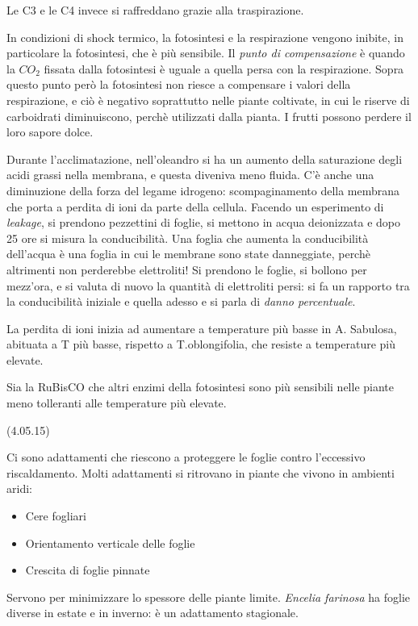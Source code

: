 \documentclass[a4paper,12pt]{book}
\begin{document}
Le C3 e le C4 invece si raffreddano grazie alla traspirazione.

In condizioni di shock termico, la fotosintesi e la respirazione vengono inibite, in particolare la fotosintesi, che è più sensibile.
Il \emph{punto di compensazione} è quando la $CO_{2}$ fissata dalla fotosintesi è uguale a quella persa con la respirazione. Sopra questo punto però la fotosintesi non riesce a compensare i valori della respirazione, e ciò è negativo soprattutto nelle piante coltivate, in cui le riserve di carboidrati diminuiscono, perchè utilizzati dalla pianta. I frutti possono perdere il loro sapore dolce.

Durante l'acclimatazione, nell'oleandro si ha un aumento della saturazione degli acidi grassi nella membrana, e questa diveniva meno fluida. C'è anche una diminuzione della forza del legame idrogeno: scompaginamento della membrana che porta a perdita di ioni da parte della cellula. Facendo un esperimento di \emph{leakage}, si prendono pezzettini di foglie, si mettono in acqua deionizzata e dopo 25 ore si misura la conducibilità. Una foglia che aumenta la conducibilità dell'acqua è una foglia in cui le membrane sono state danneggiate, perchè altrimenti non perderebbe elettroliti! Si prendono le foglie, si bollono per mezz'ora, e si valuta di nuovo la quantità di elettroliti persi: si fa un rapporto tra la conducibilità iniziale e quella adesso e si parla di \emph{danno percentuale}. 

La perdita di ioni inizia ad aumentare a temperature più basse in A. Sabulosa, abituata a T più basse, rispetto a T.oblongifolia, che resiste a temperature più elevate.

Sia la RuBisCO che altri enzimi della fotosintesi sono più sensibili nelle piante meno tolleranti alle temperature più elevate.
 
(4.05.15)

Ci sono adattamenti che riescono a proteggere le foglie contro l'eccessivo riscaldamento. Molti adattamenti si ritrovano in piante che vivono in ambienti aridi:
\begin{itemize}
\item{Cere fogliari}
\item{Orientamento verticale delle foglie}
\item{Crescita di foglie pinnate} 
\end{itemize}

Servono per minimizzare lo spessore delle piante limite. \emph{Encelia farinosa} ha foglie diverse in estate e in inverno: è un adattamento stagionale.
\end{document}

